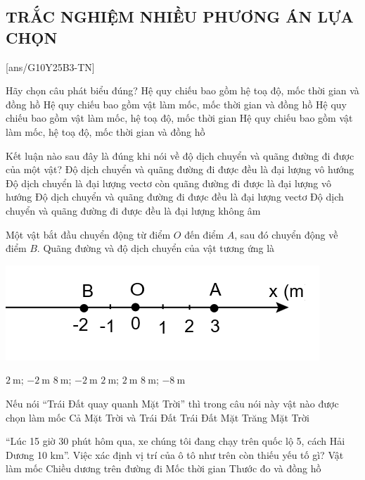 \subsection{TRẮC NGHIỆM NHIỀU PHƯƠNG ÁN LỰA CHỌN}
\setcounter{ex}{0}
[ans/G10Y25B3-TN]
\begin{ex}
	Hãy chọn câu phát biểu đúng?
	\choice
	{Hệ quy chiếu bao gồm hệ toạ độ, mốc thời gian và đồng hồ}
	{Hệ quy chiếu bao gồm vật làm mốc, mốc thời gian và đồng hồ}
	{Hệ quy chiếu bao gồm vật làm mốc, hệ toạ độ, mốc thời gian}
	{\True Hệ quy chiếu bao gồm vật làm mốc, hệ toạ độ, mốc thời gian và đồng hồ}
	\loigiai{
	}
\end{ex}

\begin{ex}
	Kết luận nào sau đây là đúng khi nói về độ dịch chuyển và quãng đường đi được của một vật?
	\choice
	{Độ dịch chuyển và quãng đường đi được đều là đại lượng vô hướng}
	{\True Độ dịch chuyển là đại lượng vectơ còn quãng đường đi được là đại lượng vô hướng}
	{Độ dịch chuyển và quãng đường đi được đều là đại lượng vectơ}
	{Độ dịch chuyển và quãng đường đi được đều là đại lượng không âm}
	\loigiai{
	}
\end{ex}

\begin{ex}
	Một vật bắt đầu chuyển động từ điểm $O$ đến điểm $A$, sau đó chuyển động về điểm $B$. Quãng đường và độ dịch chuyển của vật tương ứng là
	\begin{center}
		\includegraphics[scale=0.5]{figs/G10Y25B3-7}
	\end{center}
	\choice
	{$\SI{2}{\meter}$; $\SI{-2}{\meter}$}
	{\True $\SI{8}{\meter}$; $\SI{-2}{\meter}$}
	{$\SI{2}{\meter}$; $\SI{2}{\meter}$}
	{$\SI{8}{\meter}$; $\SI{-8}{\meter}$}
	\loigiai{
	}
\end{ex}

\begin{ex}
	Nếu nói “Trái Đất quay quanh Mặt Trời” thì trong câu nói này vật nào được chọn làm mốc
	\choice
	{Cả Mặt Trời và Trái Đất}
	{Trái Đất}
	{Mặt Trăng}
	{\True Mặt Trời}
	\loigiai{
	}
\end{ex}

\begin{ex}
	“Lúc 15 giờ 30 phút hôm qua, xe chúng tôi đang chạy trên quốc lộ 5, cách Hải Dương 10 km”. Việc xác định vị trí của ô tô như trên còn thiếu yếu tố gì?
	\choice
	{Vật làm mốc}
	{\True Chiều dương trên đường đi}
	{Mốc thời gian}
	{Thước đo và đồng hồ}
	\loigiai{
	}
\end{ex}


